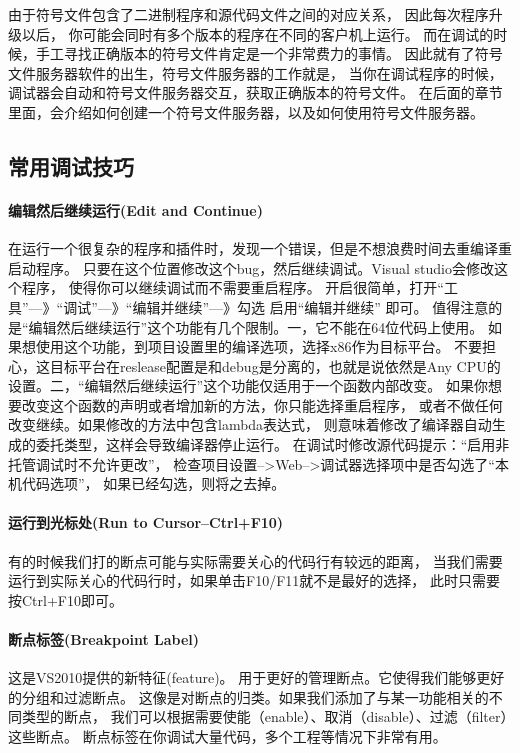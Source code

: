 \documentclass{book}
\begin{document}
由于符号文件包含了二进制程序和源代码文件之间的对应关系，
因此每次程序升级以后， 你可能会同时有多个版本的程序在不同的客户机上运行。
而在调试的时候，手工寻找正确版本的符号文件肯定是一个非常费力的事情。
因此就有了符号文件服务器软件的出生，符号文件服务器的工作就是，
当你在调试程序的时候，调试器会自动和符号文件服务器交互，获取正确版本的符号文件。
在后面的章节里面，会介绍如何创建一个符号文件服务器，以及如何使用符号文件服务器。

\subsection{常用调试技巧}

\paragraph{编辑然后继续运行(Edit and Continue)}

在运行一个很复杂的程序和插件时，发现一个错误，但是不想浪费时间去重编译重启动程序。
只要在这个位置修改这个bug，然后继续调试。Visual studio会修改这个程序，
使得你可以继续调试而不需要重启程序。
开启很简单，打开“工具”—》“调试”—》“编辑并继续”—》勾选 启用“编辑并继续” 即可。
值得注意的是“编辑然后继续运行”这个功能有几个限制。一，它不能在64位代码上使用。
如果想使用这个功能，到项目设置里的编译选项，选择x86作为目标平台。
不要担心，这目标平台在reslease配置是和debug是分离的，也就是说依然是Any CPU的设置。二，“编辑然后继续运行”这个功能仅适用于一个函数内部改变。
如果你想要改变这个函数的声明或者增加新的方法，你只能选择重启程序，
或者不做任何改变继续。如果修改的方法中包含lambda表达式，
则意味着修改了编译器自动生成的委托类型，这样会导致编译器停止运行。
在调试时修改源代码提示：“启用非托管调试时不允许更改”，
检查项目设置-->Web-->调试器选择项中是否勾选了“本机代码选项”，
如果已经勾选，则将之去掉。

\paragraph{运行到光标处(Run to Cursor--Ctrl+F10)}有的时候我们打的断点可能与实际需要关心的代码行有较远的距离，
当我们需要运行到实际关心的代码行时，如果单击F10/F11就不是最好的选择，
此时只需要按Ctrl+F10即可。

\paragraph{断点标签(Breakpoint Label)}这是VS2010提供的新特征(feature)。
用于更好的管理断点。它使得我们能够更好的分组和过滤断点。
这像是对断点的归类。如果我们添加了与某一功能相关的不同类型的断点，
我们可以根据需要使能（enable）、取消（disable）、过滤（filter）这些断点。
断点标签在你调试大量代码，多个工程等情况下非常有用。
\end{document}
